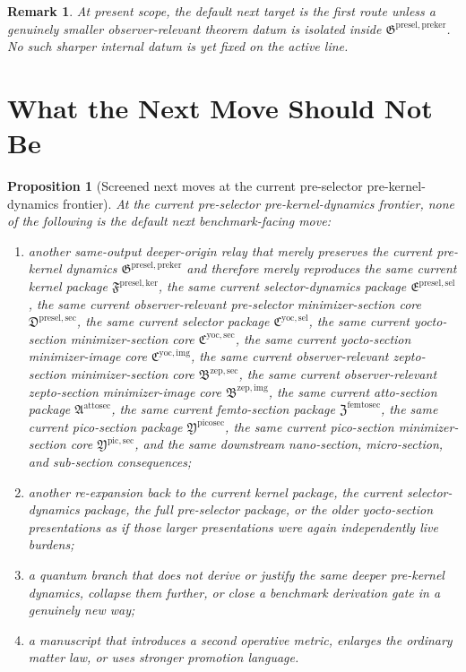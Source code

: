 \documentclass[11pt]{article}
\newcommand{\PreKernelPackage}{\mathfrak G^{\mathrm{presel,preker}}}
\newcommand{\KernelPackage}{\mathfrak F^{\mathrm{presel,ker}}}
\newcommand{\PreSectionSelectorPackage}{\mathfrak E^{\mathrm{presel,sel}}}
\newcommand{\PreSelectorMinSectionCore}{\mathfrak D^{\mathrm{presel,sec}}}
\newcommand{\YoctoSelectorPackage}{\mathfrak C^{\mathrm{yoc,sel}}}
\newcommand{\YoctoImageCore}{\mathfrak C^{\mathrm{yoc,img}}}
\newcommand{\YoctoMinSectionCore}{\mathfrak C^{\mathrm{yoc,sec}}}
\newcommand{\ZeptoImageCore}{\mathfrak B^{\mathrm{zep,img}}}
\newcommand{\ZeptoMinSectionCore}{\mathfrak B^{\mathrm{zep,sec}}}
\newcommand{\AttoSectionPackage}{\mathfrak A^{\mathrm{attosec}}}
\newcommand{\FemtoSectionPackage}{\mathfrak Z^{\mathrm{femtosec}}}
\newcommand{\PicoSectionPackage}{\mathfrak Y^{\mathrm{picosec}}}
\newcommand{\PicoMinSectionCore}{\mathfrak Y^{\mathrm{pic,sec}}}
\newtheorem{proposition}{Proposition}
\newtheorem{remark}{Remark}
\begin{document}
\begin{remark}
At present scope, the default next target is the first route unless a genuinely smaller observer-relevant theorem datum is isolated inside \(\PreKernelPackage\). No such sharper internal datum is yet fixed on the active line.
\end{remark}

\section{What the Next Move Should Not Be}

\begin{proposition}[Screened next moves at the current pre-selector pre-kernel-dynamics frontier]
At the current pre-selector pre-kernel-dynamics frontier, none of the following is the default next benchmark-facing move:
\begin{enumerate}
    \item another same-output deeper-origin relay that merely preserves the current pre-kernel dynamics \(\PreKernelPackage\) and therefore merely reproduces the same current kernel package \(\KernelPackage\), the same current selector-dynamics package \(\PreSectionSelectorPackage\), the same current observer-relevant pre-selector minimizer-section core \(\PreSelectorMinSectionCore\), the same current selector package \(\YoctoSelectorPackage\), the same current yocto-section minimizer-section core \(\YoctoMinSectionCore\), the same current yocto-section minimizer-image core \(\YoctoImageCore\), the same current observer-relevant zepto-section minimizer-section core \(\ZeptoMinSectionCore\), the same current observer-relevant zepto-section minimizer-image core \(\ZeptoImageCore\), the same current atto-section package \(\AttoSectionPackage\), the same current femto-section package \(\FemtoSectionPackage\), the same current pico-section package \(\PicoSectionPackage\), the same current pico-section minimizer-section core \(\PicoMinSectionCore\), and the same downstream nano-section, micro-section, and sub-section consequences;
    \item another re-expansion back to the current kernel package, the current selector-dynamics package, the full pre-selector package, or the older yocto-section presentations as if those larger presentations were again independently live burdens;
    \item a quantum branch that does not derive or justify the same deeper pre-kernel dynamics, collapse them further, or close a benchmark derivation gate in a genuinely new way;
    \item a manuscript that introduces a second operative metric, enlarges the ordinary matter law, or uses stronger promotion language.
\end{enumerate}
\end{proposition}
\end{document}
